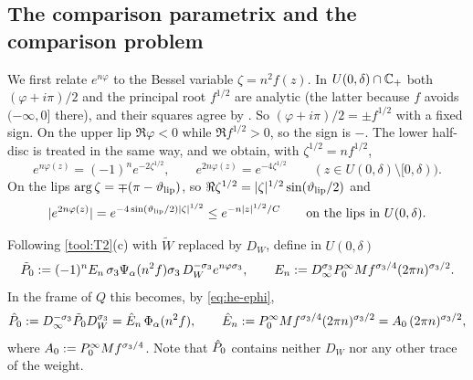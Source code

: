 \subsection{The comparison parametrix and the comparison problem}\label{sec:he-comparison}

We first relate $e^{n\varphi}$ to the Bessel variable $\zeta=n^2f(z)$. In $U(0,\delta)\cap\mathbb{C}_+$ both $(\varphi+i\pi)/2$ and
the principal root $f^{1/2}$ are analytic (the latter because $f$ avoids $(-\infty,0]$ there), and their squares agree
by . So $(\varphi+i\pi)/2=\pm f^{1/2}$ with a fixed sign. On the upper lip $\Re\varphi<0$ while $\Re f^{1/2}>0$, so the
sign is $-$. The lower half-disc is treated in the same way, and we obtain, with $\zeta^{1/2}=nf^{1/2}$,
\begin{equation}\label{eq:he-ephi}
  e^{n\varphi(z)}=(-1)^ne^{-2\zeta^{1/2}},\qquad e^{2n\varphi(z)}=e^{-4\zeta^{1/2}}\qquad(z\in U(0,\delta)\setminus[0,\delta)).
\end{equation}
On the lips $\arg\zeta=\mp(\pi-\vartheta_{\mathrm{lip}})$, so $\Re\zeta^{1/2}=|\zeta|^{1/2}\sin(\vartheta_{\mathrm{lip}}/2)$ and
\begin{equation}\label{eq:he-localisation}
  |e^{2n\varphi(z)}|=e^{-4\sin(\vartheta_{\mathrm{lip}}/2)|\zeta|^{1/2}}\le e^{-n|z|^{1/2}/C}\qquad\text{on the lips in }U(0,\delta).
\end{equation}

Following \ref{tool:T2}(c) with $\tilde W$ replaced by $D_W$, define in $U(0,\delta)$
\begin{equation}\label{eq:he-P0}
  \tilde P_0:=(-1)^nE_n\,\sigma_3\Psi_\alpha(n^2f)\sigma_3\,D_W^{-\sigma_3}e^{n\varphi\sigma_3},\qquad
  E_n:=D_\infty^{\sigma_3}P^\infty_0 Mf^{\sigma_3/4}(2\pi n)^{\sigma_3/2}.
\end{equation}
In the frame of $Q$ this becomes, by \eqref{eq:he-ephi},
\begin{equation}\label{eq:he-P0hat}
  \hat P_0:=D_\infty^{-\sigma_3}\tilde P_0D_W^{\sigma_3}=\hat E_n\,\Phi_\alpha(n^2f),\qquad
  \hat E_n:=P^\infty_0 Mf^{\sigma_3/4}(2\pi n)^{\sigma_3/2}=A_0\,(2\pi n)^{\sigma_3/2},
\end{equation}
where $A_0:=P^\infty_0 Mf^{\sigma_3/4}$. Note that $\hat P_0$ contains neither $D_W$ nor any other trace of the weight.

